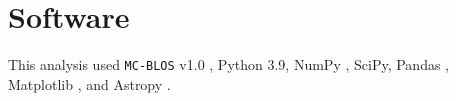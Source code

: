 \documentclass[twocolumn]{aastex701}
\begin{document}







\section{Software}

This analysis used \texttt{MC-BLOS} v1.0 \citep{tahani2025mcblos},
Python 3.9, NumPy \citep{harris2020array}, SciPy, Pandas
\citep{mckinney2010data},
Matplotlib \citep{hunter2007matplotlib}, and Astropy
\citep{astropy2022astropy}.
\end{document}
